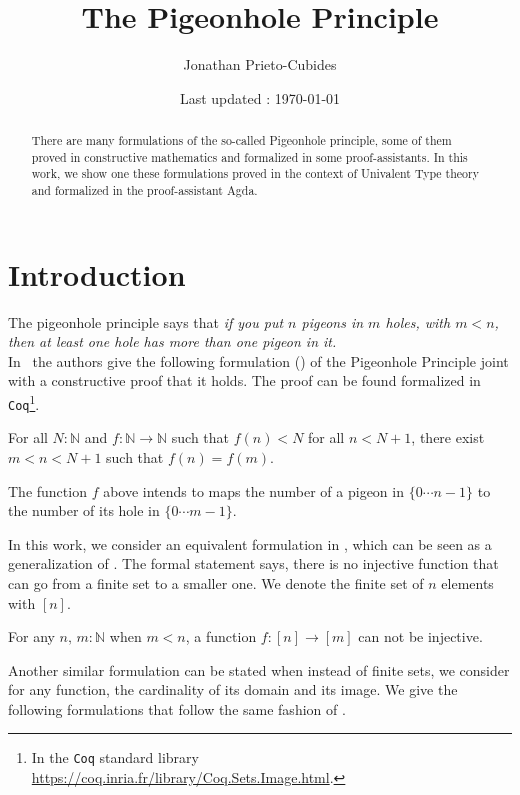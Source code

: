 \documentclass[11pt, a4paper, oneside]{amsart}
\title{The Pigeonhole Principle}
\date{Last updated : \today}
\author{Jonathan Prieto-Cubides}
\begin{document}
\maketitle

\begin{abstract}
There are many formulations of the so-called Pigeonhole principle,
some of them proved in constructive mathematics and formalized
in some proof-assistants. In this work, we show one these formulations
proved in the context of Univalent Type theory and
formalized in the proof-assistant Agda.
\end{abstract}

\section{Introduction}

The pigeonhole principle says that \emph{if you put $n$ pigeons in
$m$ holes, with $m < n$, then at least one hole has more
than one pigeon in it.
}\\

In~\cite{symmetrybook} the authors give the following formulation
() of the Pigeonhole Principle joint with a constructive proof
that it holds. The proof can be found formalized in \texttt{Coq}\footnote{In
the \texttt{Coq} standard library
\url{https://coq.inria.fr/library/Coq.Sets.Image.html}.}.

\begin{theorem}\label{lem:PHP}
For all $N:ℕ$ and $f:ℕ\to ℕ$ such that $f(n)<N$
for all $n<N+1$, there exist $m < n < N+1$ such that $f(n)=f(m)$.
\end{theorem}
The function $f$ above intends to maps the number of a pigeon in $\{0\cdots n−1\}$ to
the number of its hole in $\{0\cdots m−1\}$.

In this work, we consider an equivalent formulation in ,
which can be seen as a generalization of . The formal statement
says, there is no injective function that can go from a finite set to a smaller
one. We denote the finite set of $n$ elements with $[n]$.

\begin{theorem}\label{pigeon-theorem}
For any $n,\, m : ℕ$ when $m < n$,  a function $f : [ n ] \to [ m ]$
can not be injective.
\end{theorem}

Another similar formulation can be stated when instead of finite sets, we
consider for any function, the cardinality of its domain and its image. We
give the following formulations that follow the same fashion of
.
\end{document}
